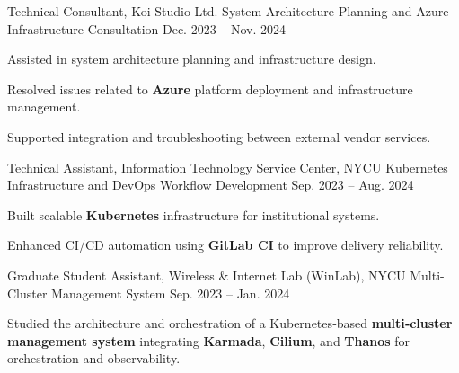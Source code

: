 \begin{cventries}
  \cventry
  {Technical Consultant, Koi Studio Ltd.} %
  {System Architecture Planning and Azure Infrastructure Consultation} %
  {} %
  {Dec. 2023 -- Nov. 2024} %
  {
    \begin{cvitems}
      \item {Assisted in system architecture planning and infrastructure design.}
      \item {Resolved issues related to \textbf{Azure} platform deployment and infrastructure management.}
      \item {Supported integration and troubleshooting between external vendor services.}
    \end{cvitems}
  }

  \cventry
  {Technical Assistant, Information Technology Service Center, NYCU} %
  {Kubernetes Infrastructure and DevOps Workflow Development} %
  {} %
  {Sep. 2023 -- Aug. 2024} %
  {
    \begin{cvitems}
      \item {Built scalable \textbf{Kubernetes} infrastructure for institutional systems.}
      \item {Enhanced CI/CD automation using \textbf{GitLab CI} to improve delivery reliability.}
    \end{cvitems}
  }

  
  \cventry
    {Graduate Student Assistant, Wireless \& Internet Lab (WinLab), NYCU} %
    {Multi-Cluster Management System} %
    {} %
    {Sep. 2023 -- Jan. 2024} %
    {
      \begin{cvitems}
        \item {Studied the architecture and orchestration of a Kubernetes‑based \textbf{multi‑cluster management system} integrating
\textbf{Karmada}, \textbf{Cilium}, and \textbf{Thanos} for orchestration and observability.}
      \end{cvitems}
    }




    
 
\end{cventries}
